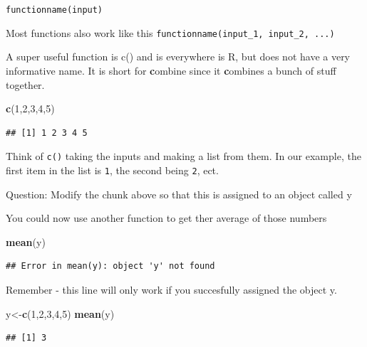 \documentclass[]{book}
\newenvironment{Shaded}{\begin{snugshade}}{\end{snugshade}}
\newcommand{\DecValTok}[1]{\textcolor[rgb]{0.00,0.00,0.81}{#1}}
\newcommand{\KeywordTok}[1]{\textcolor[rgb]{0.13,0.29,0.53}{\textbf{#1}}}
\newcommand{\NormalTok}[1]{#1}
\begin{document}
\texttt{functionname(input)}

Most functions also work like this
\texttt{functionname(input\_1,\ input\_2,\ ...)}

A super useful function is c() and is everywhere is R, but does not have a very informative name. It is short for \textbf{c}ombine since it \textbf{c}ombines a bunch of stuff together.

\begin{Shaded}
\begin{Highlighting}[]
\KeywordTok{c}\NormalTok{(}\DecValTok{1}\NormalTok{,}\DecValTok{2}\NormalTok{,}\DecValTok{3}\NormalTok{,}\DecValTok{4}\NormalTok{,}\DecValTok{5}\NormalTok{)}
\end{Highlighting}
\end{Shaded}

\begin{verbatim}
## [1] 1 2 3 4 5
\end{verbatim}

Think of \texttt{c()} taking the inputs and making a list from them. In our example, the first item in the list is \texttt{1}, the second being \texttt{2}, ect.

Question: Modify the chunk above so that this is assigned to an object called y

You could now use another function to get ther average of those numbers

\begin{Shaded}
\begin{Highlighting}[]
\KeywordTok{mean}\NormalTok{(y)}
\end{Highlighting}
\end{Shaded}

\begin{verbatim}
## Error in mean(y): object 'y' not found
\end{verbatim}

Remember - this line will only work if you succesfully assigned the object y.

\begin{Shaded}
\begin{Highlighting}[]
\NormalTok{y<-}\KeywordTok{c}\NormalTok{(}\DecValTok{1}\NormalTok{,}\DecValTok{2}\NormalTok{,}\DecValTok{3}\NormalTok{,}\DecValTok{4}\NormalTok{,}\DecValTok{5}\NormalTok{)}
\KeywordTok{mean}\NormalTok{(y)}
\end{Highlighting}
\end{Shaded}

\begin{verbatim}
## [1] 3
\end{verbatim}
\end{document}
